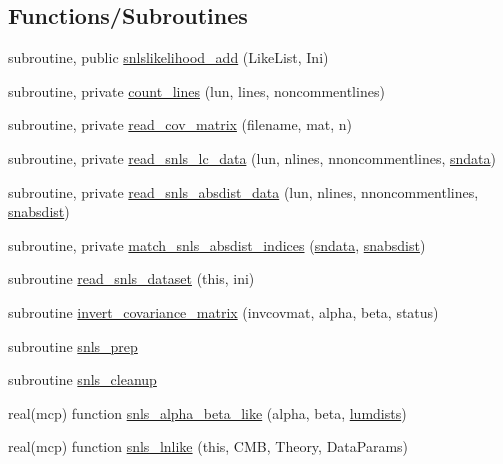 \subsection*{Functions/\+Subroutines}
\begin{DoxyCompactItemize}
\item 
subroutine, public \mbox{\hyperlink{namespacesnls_a93456d40d3b103bc17faf5bafac66d76}{snlslikelihood\+\_\+add}} (Like\+List, Ini)
\item 
subroutine, private \mbox{\hyperlink{namespacesnls_a956019aee61f8e8b602d1b4edb635909}{count\+\_\+lines}} (lun, lines, noncommentlines)
\item 
subroutine, private \mbox{\hyperlink{namespacesnls_a7ebffb6abfd2942fbb0304d2ba6a234a}{read\+\_\+cov\+\_\+matrix}} (filename, mat, n)
\item 
subroutine, private \mbox{\hyperlink{namespacesnls_a7f1db3cfd4fe644d65ae48d23062420a}{read\+\_\+snls\+\_\+lc\+\_\+data}} (lun, nlines, nnoncommentlines, \mbox{\hyperlink{namespacesnls_ad60f7a857849e3df34947a9a90a53f38}{sndata}})
\item 
subroutine, private \mbox{\hyperlink{namespacesnls_aac6e7755970b914ec53a7e7f2c6ad529}{read\+\_\+snls\+\_\+absdist\+\_\+data}} (lun, nlines, nnoncommentlines, \mbox{\hyperlink{namespacesnls_aa9cb8d9344c2bfe3a01327e48ae3aaf1}{snabsdist}})
\item 
subroutine, private \mbox{\hyperlink{namespacesnls_afabbfedccf34ae3b625359e7b29e67eb}{match\+\_\+snls\+\_\+absdist\+\_\+indices}} (\mbox{\hyperlink{namespacesnls_ad60f7a857849e3df34947a9a90a53f38}{sndata}}, \mbox{\hyperlink{namespacesnls_aa9cb8d9344c2bfe3a01327e48ae3aaf1}{snabsdist}})
\item 
subroutine \mbox{\hyperlink{namespacesnls_ae4b5fd7439c0c4620a5d9369c2782c9a}{read\+\_\+snls\+\_\+dataset}} (this, ini)
\item 
subroutine \mbox{\hyperlink{namespacesnls_a46f1f0ddbecf69ac1dbfa16bfd6af020}{invert\+\_\+covariance\+\_\+matrix}} (invcovmat, alpha, beta, status)
\item 
subroutine \mbox{\hyperlink{namespacesnls_aa7659f323fe80a70e09e7c1b3257cf5b}{snls\+\_\+prep}}
\item 
subroutine \mbox{\hyperlink{namespacesnls_aceae969ecb486792f081d6533244fd09}{snls\+\_\+cleanup}}
\item 
real(mcp) function \mbox{\hyperlink{namespacesnls_a31b64210643b2a6f625a1925f01c1194}{snls\+\_\+alpha\+\_\+beta\+\_\+like}} (alpha, beta, \mbox{\hyperlink{namespacesnls_a5cc70993d1d6e6f59706685f982260ee}{lumdists}})
\item 
real(mcp) function \mbox{\hyperlink{namespacesnls_a9983ad3e174e1ba1d0b862b463a8df40}{snls\+\_\+lnlike}} (this, C\+MB, Theory, Data\+Params)
\end{DoxyCompactItemize}
